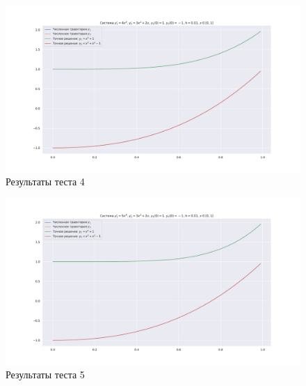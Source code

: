 \documentclass[14pt,a4paper]{extarticle}
\newcommand{\1}{\mathbbm{1}}
\begin{document}
\begin{figure}
    \centering
    \includegraphics[scale=0.4]{figs/Test4.pdf}
    \caption{Результаты теста 4}
\end{figure}

\begin{figure}
    \centering
    \includegraphics[scale=0.4]{figs/Test5.pdf}
    \caption{Результаты теста 5}
\end{figure}
\end{document}
